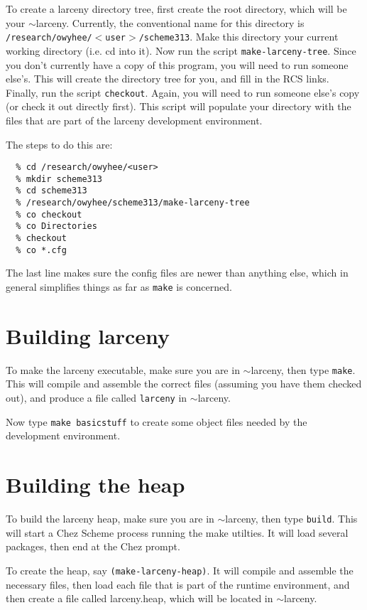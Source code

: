 To create a larceny directory tree, first create the root directory,
which will be your $\sim$larceny.  Currently, the conventional name
for this directory is {\tt /research/owyhee/$<$user$>$/scheme313}.
Make this directory your current working directory (i.e. cd into it).
Now run the script {\tt make-larceny-tree}.  Since you don't currently
have a copy of this program, you will need to run someone else's.  
This will create the directory tree for you, and fill in the RCS links.
Finally, run the script {\tt checkout}.  Again, you will need
to run someone else's copy (or check it out directly first).  This
script will populate your directory with the files that are part of
the larceny development environment.

The steps to do this are:
\begin{verbatim}
  % cd /research/owyhee/<user>
  % mkdir scheme313
  % cd scheme313
  % /research/owyhee/scheme313/make-larceny-tree
  % co checkout
  % co Directories
  % checkout
  % co *.cfg
\end{verbatim}

The last line makes sure the config files are newer than anything else,
which in general simplifies things as far as {\tt make} is concerned.

\section{Building larceny}

To make the larceny executable, make sure you are in $\sim$larceny,
then type {\tt make}.   This will compile and assemble the correct
files (assuming you have them checked out), and produce a file called
{\tt larceny} in $\sim$larceny.

Now type {\tt make~basicstuff} to create some object files needed by the
development environment.

\section{Building the heap}

To build the larceny heap, make sure you are in $\sim$larceny, 
then type {\tt build}.  This will start a Chez Scheme process running
the make utilties.  It will load several packages, then end at
the Chez prompt.

To create the heap, say {\tt (make-larceny-heap)}.  It will compile
and assemble the necessary files, then load each file that is part
of the runtime environment, and then create a file called larceny.heap, 
which will be located in $\sim$larceny.

